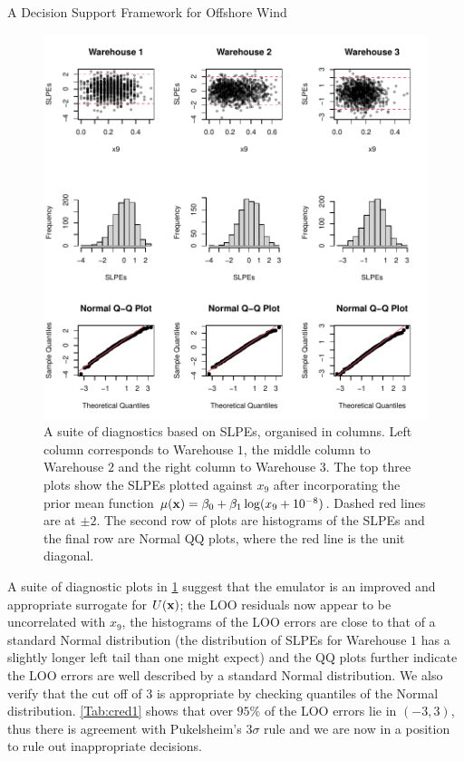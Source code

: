 \begin{chapter}{A Decision Support Framework for Offshore Wind \label{Ch:ds-for-ow}}
\begin{figure}
 \centering
 \includegraphics{fig-ds/second-resids.pdf}
 \caption{A suite of diagnostics based on SLPEs, organised in columns. Left column corresponds to Warehouse $1$, the middle column to Warehouse $2$ and the right column to Warehouse $3$. The top three plots show the SLPEs plotted against $x_9$ after incorporating the prior mean function $\mu(\mathbf{x}) = \beta_0 + \beta_1 \log (x_9 + 10^{-8})$. Dashed red lines are at $\pm2$. The second row of plots are histograms of the SLPEs and the final row are Normal QQ plots, where the red line is the unit diagonal.\label{Fig:second-loo}}
\end{figure}
 A suite of diagnostic plots in \cref{Fig:second-loo} suggest that the emulator is an improved and appropriate surrogate for $U(\mathbf{x})$; the LOO residuals now appear to be uncorrelated with $x_9$, the histograms of the LOO errors are close to that of a standard Normal distribution (the distribution of SLPEs for Warehouse $1$ has a slightly longer left tail than one might expect) and the QQ plots further indicate the LOO errors are well described by a standard Normal distribution. We also verify that the cut off of $3$ is appropriate by checking quantiles of the Normal distribution. \cref{Tab:cred1} shows that over $95\%$ of the LOO errors lie in $(-3,3)$, thus there is agreement with Pukelsheim's $3\sigma$ rule and we are now in a position to rule out inappropriate decisions.

\end{chapter}
